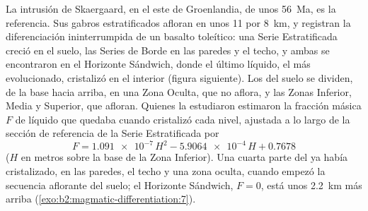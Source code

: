 La intrusión de Skaergaard, en el este de Groenlandia, de unos \qty{56}{Ma}, es la
referencia. Sus gabros estratificados afloran en unos 11 por \qty{8}{km}, y registran la
diferenciación ininterrumpida de un basalto toleítico: una Serie Estratificada creció en el
suelo, las Series de Borde en las paredes y el techo, y ambas se encontraron en el Horizonte Sándwich,
donde el último líquido, el más evolucionado, cristalizó en el interior (figura siguiente).
Los  del suelo se dividen, de la base hacia arriba, en una Zona Oculta, que no aflora,
y las Zonas Inferior, Media y Superior, que afloran. Quienes la
estudiaron estimaron la fracción másica $F$ de líquido que quedaba cuando cristalizó cada nivel, ajustada
a lo largo de la sección de referencia de la Serie Estratificada por
\[
F = \num{1.091e-7}\,H^2 - \num{5.9064e-4}\,H + 0.7678
\]
($H$ en metros sobre la base de la Zona Inferior). Una cuarta parte del  ya había
cristalizado, en las paredes, el techo y una zona oculta, cuando empezó la secuencia
aflorante del suelo; el Horizonte Sándwich, $F = 0$, está unos \qty{2.2}{km} más arriba
(\cref{exo:b2:magmatic-differentiation:7}).

